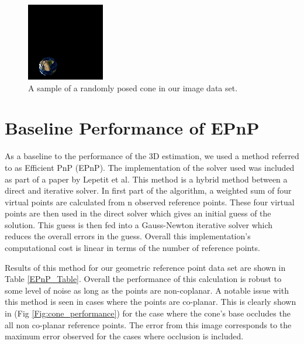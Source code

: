 \documentclass[journal]{IEEEtran}
\begin{document}
\begin{figure}[H]
	\hspace{-10 ex}

	\centering
	\includegraphics[width=.6\linewidth]{sphere_450}

	\caption{A sample of a randomly posed cone in our image data set.}
	\label{openglSphere}
\end{figure}

\section{Baseline Performance of EPnP}

 As a baseline to the performance of the 3D estimation, we used a method referred to as Efficient PnP (EPnP). The implementation of the solver used was included as part of a paper by Lepetit et al\cite{EPnP}. This method is a hybrid method between a direct and iterative solver. In first part of the algorithm, a weighted sum of four virtual points are calculated from n observed reference points. These four virtual points are then used in the direct solver which gives an initial guess of the solution. This guess is then fed into a Gauss-Newton iterative solver which reduces the overall errors in the guess. Overall this implementation's computational cost is linear in terms of the number of reference points.
 
 Results of this method for our geometric reference point data set are shown in Table \ref{EPnP_Table}. Overall the performance of this calculation is robust to some level of noise as long as the points are non-coplanar. A notable issue with this method is seen in cases where the points are co-planar. This is clearly shown in (Fig \ref{Fig:cone_performance}) for the case where the cone's base occludes the all non co-planar reference points. The error from this image corresponds to the maximum error observed for the cases where occlusion is included. 
 
\end{document}
